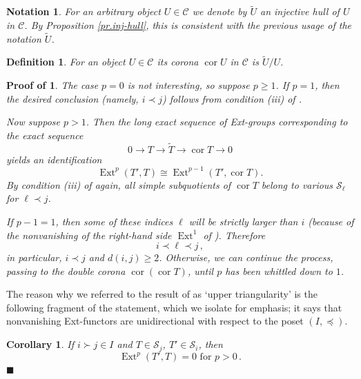 \documentclass[11pt]{article}
\theoremstyle{plain}
\newtheorem{corollary}[lemma]{Corollary}
\theoremstyle{nonumberplain}
\theoremstyle{plain}
\newtheorem{definition}[lemma]{Definition}
\newtheorem{notation}[lemma]{Notation}
\theoremstyle{nonumberplain}
\newtheorem{proof-of-uptri}{Proof of \Cref{pr.up-tri}}
\newcommand\cC{\mathcal C}
\newcommand\cS{\mathcal S}
\DeclareMathOperator{\ext}{\mathrm{Ext}}
\DeclareMathOperator{\cor}{\mathrm{cor}}
\newcommand{\qedhere}{\mbox{}\hfill\ensuremath{\blacksquare}}
\begin{document}
\begin{notation}\label{not.inj}
  For an arbitrary object $U\in \cC$ we denote by $\widetilde{U}$ {an
  injective hull of $U$ in} $\cC$.  By Proposition \ref{pr.inj-hull}, this is consistent with the previous usage of the notation $\widetilde{U}$.
\end{notation}


\begin{definition}\label{def.corona}
  For an object $U\in \cC$ its {\it corona} $\cor U$ in $\cC$ is
  $\widetilde{U}/U$. 
\end{definition}



\begin{proof-of-uptri}
The case $p=0$ is not interesting, so suppose $p\ge 1$. If $p=1$, then
the desired conclusion (namely, $i\prec j$) follows from condition (iii) of
. 

Now suppose $p>1$. Then the long exact sequence of Ext-groups corresponding to the exact sequence
$$0 \to T\to \tilde{T}\to \cor T \to 0$$
yields an identification
\begin{equation}\label{eq:p_1}
  \ext^p(T',T)\cong \ext^{p-1}(T',\cor T). 
\end{equation}
By condition (iii) of  again, all simple
subquotients of
$\cor T$ belong to various $\cS_{\ell}$ for ${\ell \prec} j$.

If $p-1=1$, then some of these indices ${\ell}$ will be strictly
larger than $i$ (because of the nonvanishing of the right-hand side
$\ext^1$ of ).  Therefore
\begin{equation*}
  i {\prec \ell \prec} j\,,
\end{equation*}
in particular, $i\prec j$ and $d(i,j)\geq 2$.
Otherwise, we can continue the process, passing to the double corona
$\cor(\cor T )$, until $p$ has been whittled down to $1$.
\end{proof-of-uptri}




The reason why we referred to the result of  as `upper
triangularity' is the following fragment of the statement, which we
isolate for emphasis; it says that nonvanishing Ext-functors are
unidirectional with respect to the poset $(I,{\preceq})$.


\begin{corollary}\label{cor.up-tri}
  If $i{\succ}j\in I$ and $T\in \cS_j$, $T'\in \cS_i$, then
\begin{equation*}
  \ext^p(T',T)=0\text{ for } p>0\,.
\end{equation*} \qedhere
\end{corollary}
\end{document}
